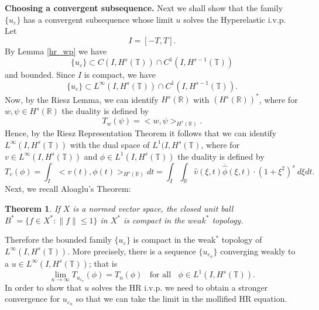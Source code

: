 \documentclass[12pt,reqno]{amsart}
\newcommand{\rr}{\mathbb{R}}
\newcommand{\ci}{\mathbb{T}}
\newcommand{\ee}{\varepsilon}
\theoremstyle{plain}  %
\newtheorem{theorem}{Theorem}
\theoremstyle{definition}
\begin{document}
\begin{appendices}
		{\bf Choosing  a convergent subsequence.}
		Next we shall show that  the family $\{ u_\ee\}$ has a convergent subsequence
		whose limit $u$ solves the Hyperelastic i.v.p. 
		Let
		$$
		I= [-T, T].
		$$
		By Lemma \ref{hr_wp} we have 
		\begin{equation}
			\label{C-1-fam}
			\{u_\ee\}\subset C(I, H^s(\ci))\cap C^1(I, H^{s-1}(\ci))
		\end{equation}
		and bounded. Since $I$ is compact, we have  
		\begin{equation}
			\label{Lip-1-fam}
			\{u_\ee\}\subset L^{\infty}(I, H^s(\ci))\cap C^1(I,
			H^{s-1}(\ci)).
		\end{equation}
		Now, by the Riesz Lemma, we can identify $H^s(\rr)$ with
		$(H^s(\rr))^*$, where for $w, \psi \in H^s(\rr)$ the duality is
		defined by 
		\begin{equation*}
			T_w(\psi) = <w, \psi>_{H^s(\rr)}.
		\end{equation*}
		Hence, by the Riesz Representation Theorem it follows that we can
		identify \\ $L^\infty(I, H^s(\ci)) $ with the dual space of $L^1(I,
		H^{s}(\ci)$, where for $v\in L^\infty(I, H^s(\ci)) $ and $ \phi \in
		L^1(I, H^{s}(\ci))$ the duality is defined by  
		\begin{equation}
			T_v(\phi) = \int_I <v (t), \phi (t)>_{H^s(\rr)} dt  = \int_I
			 \int_{\rr}
			 \widehat{v}(\xi, t) \overline{\widehat{\phi}}(\xi, t) \cdot (1
			 + \xi^2)^s \ d \xi dt.
		\end{equation}
		Next, we recall Aloaglu's Theorem:
		\begin{theorem}
			If $X$ is a normed vector space,
			the closed unit ball $B^* = \{f \in X^* : \|f\| \le
			1\}$ in $X^*$ is compact in the $weak^*$ topology.
		\end{theorem}
		Therefore the bounded family $\{u_\ee\}$ is compact 
		in the weak$^*$ topology of \\
		$L^\infty(I, H^s(\ci))$. More precisely,
		there is a sequence  $\{ u_{\ee_n} \}$ converging
		weakly to a $ u\in L^{\infty}(I, H^s(\ci))$;
		that is 
		\begin{equation}
			\label{weak-conv}
			\lim_{n\to \infty} T_{u_{\ee_n}}(\phi)  =  T_u (\phi) 
			\; \;		
			\text{ for all } \;\;  \phi \in L^1(I, H^{s}(\ci)).
		\end{equation}
		In order to show that  $u$ solves the HR i.v.p. we need to 
		obtain a stronger  convergence for  $u_{\ee_n}$ so that 
		we can take the limit in the mollified HR equation.

\end{appendices}
\end{document}
